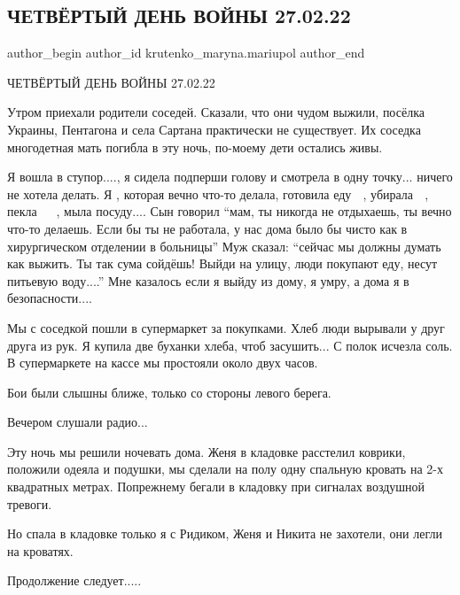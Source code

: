  
 
 
 
 

\subsection{ЧЕТВЁРТЫЙ ДЕНЬ ВОЙНЫ 27.02.22}
\label{sec:27_02_2023.fb.krutenko_maryna.mariupol.1.chetvyortii_den_voin}

\ifcmt
 author_begin
   author_id krutenko_maryna.mariupol
 author_end
\fi

ЧЕТВЁРТЫЙ ДЕНЬ ВОЙНЫ 27.02.22

Утром приехали родители соседей. Сказали, что они чудом выжили, посёлка
Украины, Пентагона и села Сартана практически не существует. Их соседка
многодетная мать погибла в эту ночь, по-моему дети остались живы. 

Я вошла в ступор...., я сидела подперши голову и смотрела в одну точку... ничего не
хотела делать. Я , которая вечно что-то делала, готовила еду 🍜 , убирала 🧹 ,
пекла 🍪 🧁 , мыла посуду.... Сын говорил \enquote{мам, ты никогда не отдыхаешь, ты вечно
что-то делаешь. Если бы ты не работала, у нас дома было бы чисто как в
хирургическом отделении в больницы} Муж сказал: \enquote{сейчас мы должны думать как
выжить. Ты так сума сойдёшь! Выйди на улицу, люди покупают еду, несут питьевую
воду....} Мне казалось если я выйду из дому,  я умру, а дома я в безопасности....

Мы с соседкой пошли в супермаркет за покупками. Хлеб люди вырывали у друг друга
из рук. Я купила две буханки хлеба, чтоб засушить... С полок исчезла соль. В
супермаркете на кассе мы простояли около двух часов. 

Бои были слышны ближе, только со стороны левого берега. 

Вечером слушали радио...

Эту ночь мы решили ночевать дома. Женя в кладовке расстелил коврики, положили
одеяла и подушки, мы сделали на полу одну спальную кровать на 2-х квадратных
метрах. Попрежнему бегали в кладовку при сигналах воздушной тревоги. 

Но спала в кладовке только я с Ридиком, Женя и Никита не захотели, они легли на
кроватях.

Продолжение следует.....

